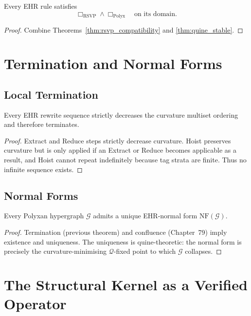 \begin{theorem}
\label{thm:joint_kernel}
Every EHR rule satisfies
\[
\Box_{\mathrm{RSVP}} \wedge \Box_{\mathrm{Polyx}}
\quad\text{on its domain.}
\]
\end{theorem}

\begin{proof}
Combine Theorems~\ref{thm:rsvp_compatibility} and \ref{thm:quine_stable}.
\end{proof}

\section{Termination and Normal Forms}

\subsection{Local Termination}

\begin{theorem}
Every EHR rewrite sequence strictly decreases the curvature multiset ordering
and therefore terminates.
\end{theorem}

\begin{proof}
Extract and Reduce steps strictly decrease curvature.
Hoist preserves curvature but is only applied if an Extract or Reduce becomes
applicable as a result, and Hoist cannot repeat indefinitely because tag strata
are finite.  
Thus no infinite sequence exists.
\end{proof}

\subsection{Normal Forms}

\begin{theorem}
Every Polyxan hypergraph $\mathcal{G}$ admits a unique EHR-normal form
$\mathrm{NF}(\mathcal{G})$.
\end{theorem}

\begin{proof}
Termination (previous theorem) and confluence (Chapter~79) imply existence and
uniqueness.  
The uniqueness is quine-theoretic: the normal form is precisely the
curvature-minimising $\mathcal{Q}$-fixed point to which $\mathcal{G}$ collapses.
\end{proof}

\section{The Structural Kernel as a Verified Operator}

